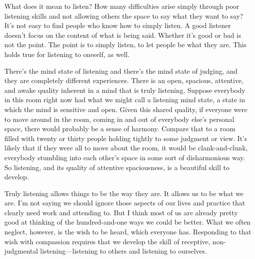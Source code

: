 
What does it mean to listen? How many difficulties arise simply through 
poor listening skills and not allowing others the space to say what 
they want to say? It's not easy to find people who know how to simply 
listen. A good listener doesn't focus on the content of what is being 
said. Whether it's good or bad is not the point. The point is to simply 
listen, to let people be what they are. This holds true for listening 
to oneself, as well.

There's the mind state of listening and there's the mind state of 
judging, and they are completely different experiences. There is an 
open, spacious, attentive, and awake quality inherent in a mind that is 
truly listening. Suppose everybody in this room right now had what we 
might call a listening mind state, a state in which the mind is 
sensitive and open. Given this shared quality, if everyone were to move 
around in the room, coming in and out of everybody else's personal 
space, there would probably be a sense of harmony. Compare that to a 
room filled with twenty or thirty people holding tightly to some 
judgment or view. It's likely that if they were all to move about the 
room, it would be clank-and-clunk, everybody stumbling into each 
other's space in some sort of disharmonious way. So listening, and its 
quality of attentive spaciousness, is a beautiful skill to develop.

Truly listening allows things to be the way they are. It allows us to 
be what we are. I'm not saying we should ignore those aspects of our 
lives and practice that clearly need work and attending to. But I think 
most of us are already pretty good at thinking of the hundred-and-one 
ways we could be better. What we often neglect, however, is the wish to 
be heard, which everyone has. Responding to that wish with compassion 
requires that we develop the skill of receptive, non-judgmental 
listening---listening to others and listening to ourselves.

